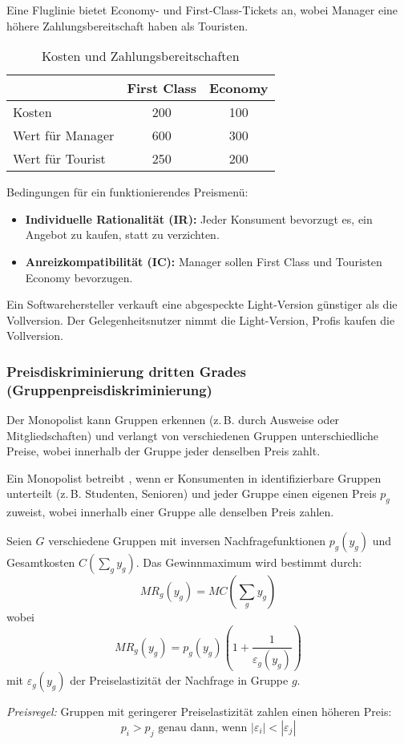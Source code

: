 \begin{example}
   Eine Fluglinie bietet Economy- und First-Class-Tickets an, wobei Manager eine höhere Zahlungsbereitschaft haben als Touristen.

\begin{table}[h]
\centering
\begin{tabular}{l|c|c}
 & First Class & Economy \\
\hline
Kosten & 200 & 100 \\
Wert für Manager & 600 & 300 \\
Wert für Tourist & 250 & 200 \\
\end{tabular}
\caption{Kosten und Zahlungsbereitschaften}
\end{table}

Bedingungen für ein funktionierendes Preismenü:
\begin{itemize}
    \item \textbf{Individuelle Rationalität (IR):} Jeder Konsument bevorzugt es, ein Angebot zu kaufen, statt zu verzichten.
    \item \textbf{Anreizkompatibilität (IC):} Manager sollen First Class und Touristen Economy bevorzugen.
\end{itemize} 
\end{example}


\begin{example}
Ein Softwarehersteller verkauft eine abgespeckte Light-Version günstiger als die Vollversion. Der Gelegenheitsnutzer nimmt die Light-Version, Profis kaufen die Vollversion.
\end{example}

\subsubsection{Preisdiskriminierung dritten Grades (Gruppenpreisdiskriminierung)}

Der Monopolist kann Gruppen erkennen (z.\,B. durch Ausweise oder Mitgliedschaften) und verlangt von verschiedenen Gruppen unterschiedliche Preise, wobei innerhalb der Gruppe jeder denselben Preis zahlt.



\begin{definition}
Ein Monopolist betreibt , wenn er Konsumenten in identifizierbare Gruppen unterteilt (z.\,B. Studenten, Senioren) und jeder Gruppe einen eigenen Preis $p_g$ zuweist, wobei innerhalb einer Gruppe alle denselben Preis zahlen.

Seien $G$ verschiedene Gruppen mit inversen Nachfragefunktionen $p_g(y_g)$ und Gesamtkosten $C(\sum_{g} y_g)$. Das Gewinnmaximum wird bestimmt durch:
\[
MR_g(y_g) = MC\left( \sum_{g} y_g \right)
\]
wobei 
\[
MR_g(y_g) = p_g(y_g) \left( 1 + \frac{1}{\varepsilon_g(y_g)} \right)
\]
mit $\varepsilon_g(y_g)$ der Preiselastizität der Nachfrage in Gruppe $g$.

\noindent \emph{Preisregel:}
Gruppen mit geringerer Preiselastizität zahlen einen höheren Preis:
\[
p_i > p_j \text{ genau dann, wenn } |\varepsilon_i| < |\varepsilon_j|
\]
\end{definition}


